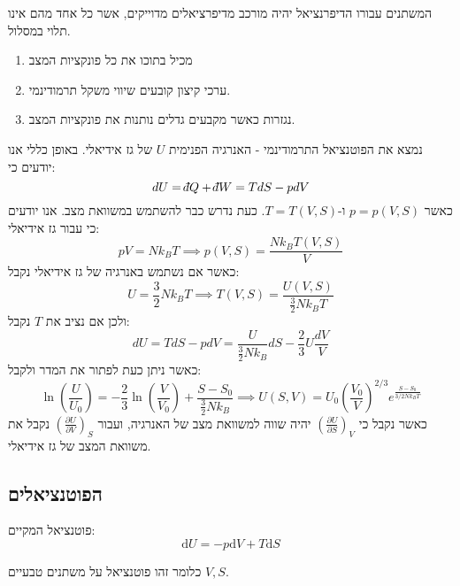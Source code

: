\documentclass{tstextbook}
\begin{document}
\begin{definition}
המשתנים עבורו הדיפרנציאל יהיה מורכב מדיפרציאלים מדוייקים, אשר כל אחד מהם אינו תלוי במסלול.

\end{definition}
\begin{proposition}
  \begin{enumerate}
    \item מכיל בתוכו את כל פונקציות המצב 


    \item ערכי קיצון קובעים שיווי משקל תרמודינמי. 


    \item נגזרות כאשר מקבעים גדלים נותנות את פונקציות המצב. 


  \end{enumerate}
\end{proposition}
\begin{example}
נמצא את הפוטנציאל התרמודינמי - האנרגיה הפנימית \(U\) של גז אידיאלי. באופן כללי אנו יודעים כי:
$$dU=\;\bar{}\mkern-7.5mu dQ+\;\bar{}\mkern-7.5mu dW =TdS - pdV$$
כאשר \(p=p(V,S)\) ו-\(T=T(V,S)\). כעת נדרש כבר להשתמש במשוואת מצב. אנו יודעים כי עבור גז אידיאלי:
$$pV=Nk_{B}T \implies p(V,S)= \frac{Nk_{B}T(V,S)}{V}$$
כאשר אם נשתמש באנרגיה של גז אידיאלי נקבל:
$$U=\frac{3}{2}Nk_{B}T\implies T(V,S)= \frac{U(V,S)}{\frac{3}{2}Nk_{B}T}$$
ולכן אם נציב את \(T\) נקבל:
$$dU= TdS-pdV=\frac{U}{\frac{3}{2}Nk_{B}}dS - \frac{2}{3}U \frac{dV}{V}$$
כאשר ניתן כעת לפתור את המדר ולקבל:
$$\ln \left( \frac{U}{U_{0}} \right)=-\frac{2}{3}\ln\left( \frac{V}{V_{0}} \right)+\frac{S-S_{0}}{\frac{3}{2}Nk_{B}} \implies U(S,V)=U_{0}\left( \frac{V_{0}}{V} \right)^{2/3} e^{ \frac{S-S_{0}}{3/2 Nk_{B}T} }$$
כאשר נקבל כי \(\left( \frac{\partial U}{\partial S} \right)_{V}\) יהיה שווה למשוואת מצב של האנרגיה, ועבור \(\left( \frac{\partial U}{\partial V} \right)_{S}\) נקבל את משוואת המצב של גז אידיאלי.

\end{example}
\subsection{הפוטנציאלים}

\begin{definition}
פוטנציאל  המקיים:
$$\mathrm{d}U=-p\mathrm{d}V+T\mathrm{d}S$$

\end{definition}
כלומר זהו פוטנציאל על משתנים טבעיים \(V,S\).
\end{document}
